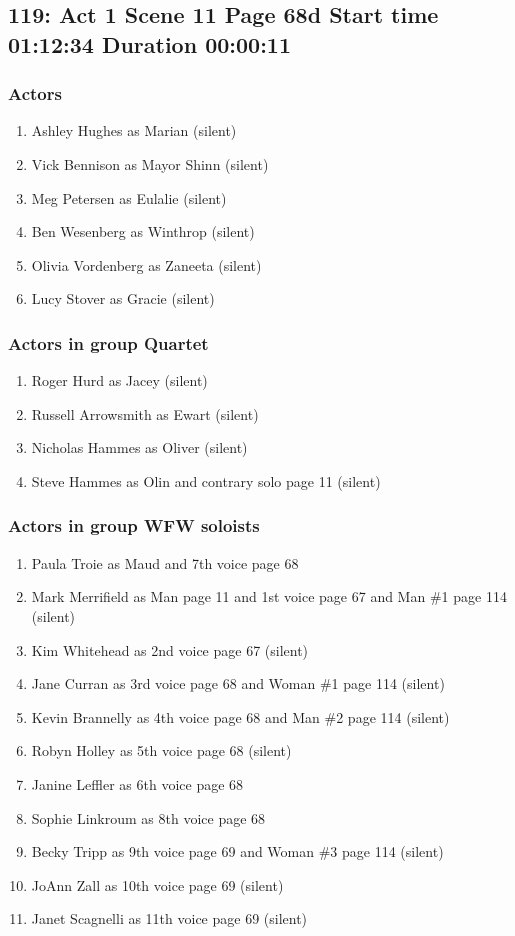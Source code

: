 \subsection{119: Act 1 Scene 11 Page 68d Start time 01:12:34 Duration 00:00:11}

\subsubsection{Actors}
\begin{enumerate}
\item Ashley Hughes as Marian (silent)
\item Vick Bennison as Mayor Shinn (silent)
\item Meg Petersen as Eulalie (silent)
\item Ben Wesenberg as Winthrop (silent)
\item Olivia Vordenberg as Zaneeta (silent)
\item Lucy Stover as Gracie (silent)
\end{enumerate}
\subsubsection{Actors in group Quartet}
\begin{enumerate}
\item Roger Hurd as Jacey (silent)
\item Russell Arrowsmith as Ewart (silent)
\item Nicholas Hammes as Oliver (silent)
\item Steve Hammes as Olin and contrary solo page 11 (silent)
\end{enumerate}
\subsubsection{Actors in group WFW soloists}
\begin{enumerate}
\item Paula Troie as Maud and 7th voice page 68
\item Mark Merrifield as Man page 11 and 1st voice page 67 and Man \#1 page 114 (silent)
\item Kim Whitehead as 2nd voice page 67 (silent)
\item Jane Curran as 3rd voice page 68 and Woman \#1 page 114 (silent)
\item Kevin Brannelly as 4th voice page 68 and Man \#2 page 114 (silent)
\item Robyn Holley as 5th voice page 68 (silent)
\item Janine Leffler as 6th voice page 68
\item Sophie Linkroum as 8th voice page 68
\item Becky Tripp as 9th voice page 69 and Woman \#3 page 114 (silent)
\item JoAnn Zall as 10th voice page 69 (silent)
\item Janet Scagnelli as 11th voice page 69 (silent)
\end{enumerate}

